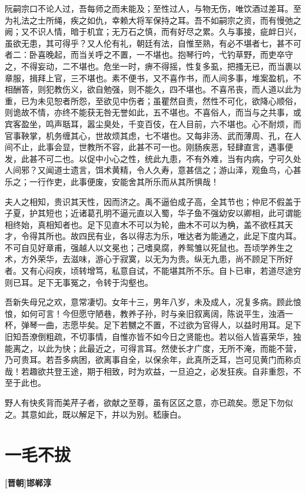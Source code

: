 \documentclass[UTF8,titlepage,oneside]{ctexbook}
\begin{document}
阮嗣宗口不论人过，吾每师之而未能及；至性过人，与物无伤，唯饮酒过差耳。至为礼法之士所绳，疾之如仇，幸赖大将军保持之耳。吾不如嗣宗之资，而有慢弛之阙；又不识人情，暗于机宜；无万石之慎，而有好尽之累。久与事接，疵衅日兴，虽欲无患，其可得乎？又人伦有礼，朝廷有法，自惟至熟，有必不堪者七，甚不可者二：卧喜晚起，而当关呼之不置，一不堪也。抱琴行吟，弋钓草野，而吏卒守之，不得妄动，二不堪也。危坐一时，痹不得摇，性复多虱，把搔无已，而当裹以章服，揖拜上官，三不堪也。素不便书，又不喜作书，而人间多事，堆案盈机，不相酬答，则犯教伤义，欲自勉强，则不能久，四不堪也。不喜吊丧，而人道以此为重，已为未见恕者所怨，至欲见中伤者；虽瞿然自责，然性不可化，欲降心顺俗，则诡故不情，亦终不能获无咎无誉如此，五不堪也。不喜俗人，而当与之共事，或宾客盈坐，鸣声聒耳，嚣尘臭处，千变百伎，在人目前，六不堪也。心不耐烦，而官事鞅掌，机务缠其心，世故烦其虑，七不堪也。又每非汤、武而薄周、孔，在人间不止，此事会显，世教所不容，此甚不可一也。刚肠疾恶，轻肆直言，遇事便发，此甚不可二也。以促中小心之性，统此九患，不有外难，当有内病，宁可久处人间邪？又闻道士遗言，饵术黄精，令人久寿，意甚信之；游山泽，观鱼鸟，心甚乐之；一行作吏，此事便废，安能舍其所乐而从其所惧哉！


夫人之相知，贵识其天性，因而济之。禹不逼伯成子高，全其节也；仲尼不假盖于子夏，护其短也；近诸葛孔明不逼元直以入蜀，华子鱼不强幼安以卿相，此可谓能相终始，真相知者也。足下见直木不可以为轮，曲木不可以为桷，盖不欲枉其天才，令得其所也。故四民有业，各以得志为乐，唯达者为能通之，此足下度内耳。不可自见好章甫，强越人以文冕也；己嗜臭腐，养鸳雏以死鼠也。吾顷学养生之术，方外荣华，去滋味，游心于寂寞，以无为为贵。纵无九患，尚不顾足下所好者。又有心闷疾，顷转增笃，私意自试，不能堪其所不乐。自卜已审，若道尽途穷则已耳。足下无事冤之，令转于沟壑也。


吾新失母兄之欢，意常凄切。女年十三，男年八岁，未及成人，况复多病。顾此悢悢，如何可言！今但愿守陋巷，教养子孙，时与亲旧叙离阔，陈说平生，浊酒一杯，弹琴一曲，志愿毕矣。足下若嬲之不置，不过欲为官得人，以益时用耳。足下旧知吾潦倒粗疏，不切事情，自惟亦皆不如今日之贤能也。若以俗人皆喜荣华，独能离之，以此为快；此最近之，可得言耳。然使长才广度，无所不淹，而能不营，乃可贵耳。若吾多病困，欲离事自全，以保余年，此真所乏耳，岂可见黄门而称贞哉！若趣欲共登王途，期于相致，时为欢益，一旦迫之，必发狂疾。自非重怨，不至于此也。


野人有快炙背而美芹子者，欲献之至尊，虽有区区之意，亦已疏矣。愿足下勿似之。其意如此，既以解足下，并以为别。嵇康白。



\chapter*{一毛不拔}
\begin{center}
	\textbf{[晋朝]邯郸淳}
\end{center}
\end{document}
